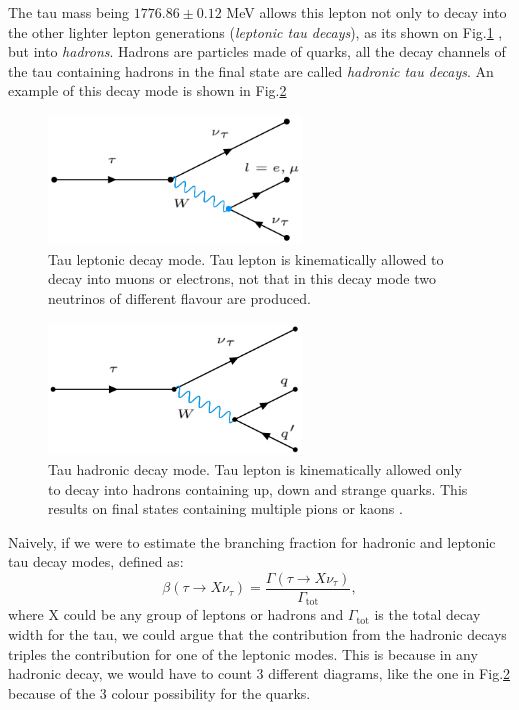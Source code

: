 The tau mass being $1776.86 \pm 0.12$ MeV allows this lepton not only to decay into the other lighter lepton generations (\textit{leptonic tau decays}), as its shown on Fig.\ref{Fig1}  , but into \textit{hadrons}. Hadrons are particles made of quarks, all the decay channels of the tau containing hadrons in the final state are called \textit{hadronic tau decays}. An example of this decay mode is shown in Fig.\ref{Fig2}
\begin{figure}[h]
	\centering
	\includegraphics[width=0.6\textwidth]{figures/Fig1}
	\caption{Tau leptonic decay mode. Tau lepton is kinematically allowed to decay into muons or electrons, not that in this decay mode two neutrinos of different flavour are produced.}
	\label{Fig1}
\end{figure}
\begin{figure}[h]
	\centering
	\includegraphics[width=0.6\textwidth]{figures/Fig2}
	\caption{Tau hadronic decay mode. Tau lepton is kinematically allowed only to decay into hadrons containing up, down and strange quarks. This results on final states containing multiple pions or kaons \cite{Davier_2006}.}
	\label{Fig2}
\end{figure}
Naively, if we were to estimate the branching fraction for hadronic and leptonic tau decay modes, defined as:
\begin{equation}
	\beta(\tau\to X\nu_\tau)=\frac{\Gamma(\tau\to X\nu_\tau)}{\Gamma_{\text{tot}}},
\end{equation}
where X could be any group of leptons or hadrons and $\Gamma_{\text{tot}}$ is the total decay width for the tau, we could argue that the contribution from the hadronic decays triples the contribution for one of the leptonic modes. This is because in any hadronic decay, we would have to count 3 different diagrams, like the one in Fig.\ref{Fig2} because of the 3 colour possibility for the quarks.

